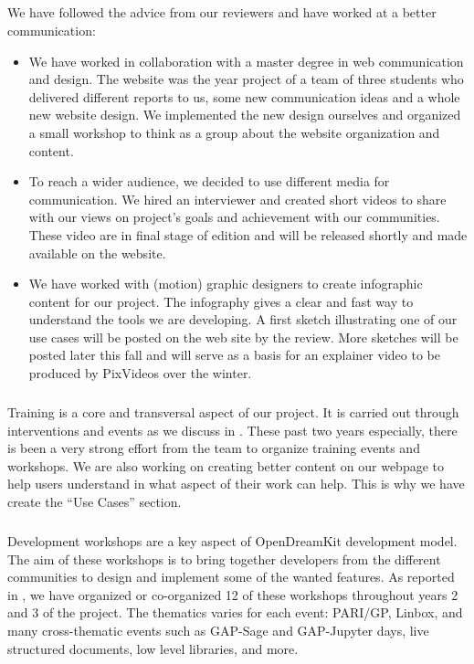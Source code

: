 \subparagraph{}
\label{dissem@dissemination-communication}

We have followed the advice from our reviewers and have worked at a better communication:
\begin{itemize}
\item We have worked in collaboration with a master degree in web communication and design. The
\ODK website was the year project of a team of three students who delivered different reports to us, some
new communication ideas and a whole new website design. We implemented the new design ourselves and
organized a small workshop to think as a group about the website organization and content.
\item To reach a wider audience, we decided to use different media for communication. We hired an interviewer
and created short videos to share with our views on project's goals and achievement with our communities. These
video are in final stage of edition and will be released shortly and made available on the website.

\item We have worked with (motion) graphic designers to create
  infographic content for our project. The infography gives a clear
  and fast way to understand the tools we are developing. A first
  sketch illustrating one of our use cases will be posted on the web
  site by the review. More sketches will be posted later this fall and
  will serve as a basis for an explainer video to be produced by
  PixVideos over the winter.
\end{itemize}

\subparagraph{}

Training is a core and transversal aspect of our project. It is carried out
through interventions and events as we discuss in . These
past two years especially, there is been a very strong effort from the \ODK team to organize
training events and workshops. We are also working on creating better content on our webpage
to help users understand in what aspect of their work can \ODK help. This is why we have create the
``Use Cases'' section.

\subparagraph{}
\label{dissem@devel-workshops}

Development workshops are a key aspect of OpenDreamKit development model. The aim of these workshops is to bring together developers from the different communities to design and implement some
of the wanted features. As reported in , we have organized
or co-organized 12 of these workshops throughout years 2 and 3 of the project. The thematics varies
for each event: PARI/GP, Linbox, and many cross-thematic events such as GAP-Sage and GAP-Jupyter days,
live structured documents, low level libraries, and more.

